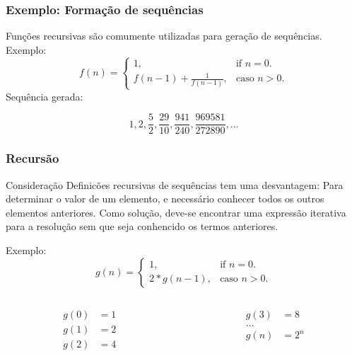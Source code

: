 \documentclass[10pt]{beamer}
\begin{document}


\begin{frame}
  \frametitle{Exemplo: Formação de sequências}
  Funções recursivas são comumente utilizadas para geração de sequências. Exemplo:
  \begin{equation}
    f(n)=\begin{cases}
      1,                         & \text{if $n=0$}.     \\
      f(n-1) + \frac{1}{f(n-1)}, & \text{caso $n > 0$}.
    \end{cases}
  \end{equation}
  \pause
  Sequência gerada:

  $$1, 2, \frac{5}{2}, \frac{29}{10}, \frac{941}{240}, \frac{969581}{272890}, \ldots$$
\end{frame}

\begin{frame}
  \frametitle{Recursão}
  \begin{block}{Consideração}
    Definicões recursivas de sequências tem uma desvantagem: Para determinar o valor de um elemento, e necessário conhecer todos os outros elementos anteriores. Como solução, deve-se encontrar uma expressão iterativa para a resolução sem que seja conhencido os termos anteriores.
  \end{block}
  Exemplo:
  \begin{equation}
    g(n)=\begin{cases}
      1,        & \text{if $n=0$}.     \\
      2*g(n-1), & \text{caso $n > 0$}.
    \end{cases}
  \end{equation}
  \begin{columns}[t]
    \begin{column}{4cm}
      \begin{align*}
        g(0) & = 1 \\
        g(1) & = 2 \\
        g(2) & = 4
      \end{align*}
    \end{column}
    \begin{column}{4cm}
      \begin{align*}
        g(3)   & = 8   \\
        \ldots &       \\
        g(n)   & = 2^n
      \end{align*}
    \end{column}
  \end{columns}
  \vfill
\end{frame}
\end{document}
